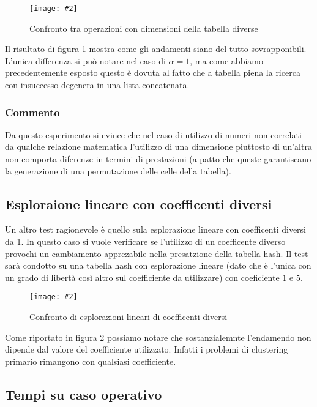 \documentclass{article}
\newcommand{\image}[3][1]{
	\centering
	\texttt{[image: \#2]}
	\caption{#3}
}
\begin{document}
\begin{figure}[H]
\image[0.75]{Insuccesso_Confronto_Lineare_d24571_d16381_scala_logaritmica_suffisso}{Confronto tra operazioni con dimensioni della tabella diverse}
\label{fig:Confronto_dimensioni}
\end{figure}

Il risultato di figura \ref{fig:Confronto_dimensioni} mostra come gli andamenti siano del tutto sovrapponibili. L'unica differenza si può notare nel caso di $\alpha = 1$, ma come abbiamo precedentemente esposto questo è dovuta al fatto che a tabella piena la ricerca con insuccesso degenera in una lista concatenata.

\subsubsection{Commento}
Da questo esperimento si evince che nel caso di utilizzo di numeri non correlati da qualche relazione matematica l'utilizzo di una dimensione piuttosto di un'altra non comporta diferenze in termini di prestazioni (a patto che queste garantiscano la generazione di una permutazione delle celle della tabella).

\subsection{Esploraione lineare con coefficenti diversi}
Un altro test ragionevole è quello sula esplorazione lineare con coefficenti diversi da 1. In questo caso si vuole verificare se l'utilizzo di un coefficente diverso provochi un cambiamento apprezabile nella presatzione della tabella hash. Il test sarà condotto su una tabella hash con esplorazione lineare (dato che è l'unica con un grado di libertà così altro sul coefficiente da utilizzare) con coeficiente $1$ e $5$.

\begin{figure}[H]
\image[0.75]{Successo_Confronto_Lineare_c1_c5_scala_logaritmica}{Confronto di esplorazioni lineari di coefficenti diversi}
\label{fig:Confronto_coefficienti}
\end{figure}

Come riportato in figura \ref{fig:Confronto_coefficienti} possiamo notare che sostanzialemnte l'endamendo non dipende dal valore del coefficiente utilizzato. Infatti i problemi di clustering primario rimangono con qualsiasi coefficiente.

\subsection{Tempi su caso operativo}
\end{document}
